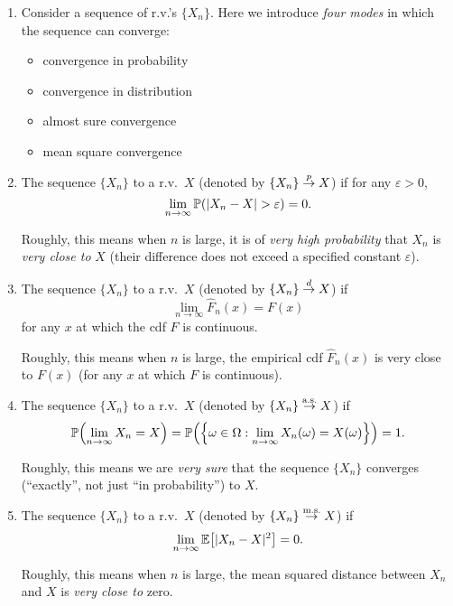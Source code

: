 \begin{enumerate}
\item Consider a sequence of r.v.'s \(\{X_n\}\). Here we introduce \emph{four
modes} in which the sequence can converge:
\begin{itemize}
\item convergence in probability
\item convergence in distribution
\item almost sure convergence
\item mean square convergence
\end{itemize}
\item The sequence \(\{X_n\}\)  to a r.v.\ \(X\)
(denoted by \(\{X_n\}\overset{p}{\to} X\)) if for any \(\varepsilon>0\),
\[
\lim_{n\to \infty}\mathbb{P}\qty(|X_n-X| >\varepsilon)=0.
\]
\begin{note}
Roughly, this means when \(n\) is large, it is of \emph{very high probability}
that \(X_n\) is \emph{very close to} \(X\) (their difference does not exceed a
specified constant \(\varepsilon\)).
\end{note}

\item The sequence \(\{X_n\}\)  to a r.v.\ \(X\)
(denoted by \(\{X_n\}\overset{d}{\to} X\)) if
\[
\lim_{n\to \infty}\widehat{F}_{n}(x)=F(x)
\]
for any \(x\) at which the cdf \(F\) is continuous.

\begin{note}
Roughly, this means when \(n\) is large, the empirical cdf
\(\widehat{F}_{n}(x)\) is very close to \(F(x)\) (for any \(x\) at which \(F\)
is continuous).
\end{note}

\item The sequence \(\{X_n\}\)  to a r.v.\ \(X\)
(denoted by \(\{X_n\}\overset{\text{a.s.}}{\to} X\)) if
\[
\mathbb{P}\qty(\lim_{n\to \infty}X_n=X)
=\mathbb{P}\qty(\qty{\omega\in\Omega:\lim_{n\to \infty}X_n(\omega)=X(\omega)})
=1.
\]

\begin{note}
Roughly, this means we are \emph{very sure} that the sequence \(\{X_n\}\)
converges (``exactly'', not just ``in probability'') to \(X\).
\end{note}

\item The sequence \(\{X_n\}\)  to a r.v.\ \(X\)
(denoted by \(\{X_n\}\overset{\text{m.s.}}{\to} X\)) if
\[
\lim_{n\to \infty}\mathbb{E}\qty[|X_n-X|^2]=0.
\]
\begin{note}
Roughly, this means when \(n\) is large, the mean squared distance between
\(X_n\) and \(X\) is \emph{very close to} zero.
\end{note}


\end{enumerate}
